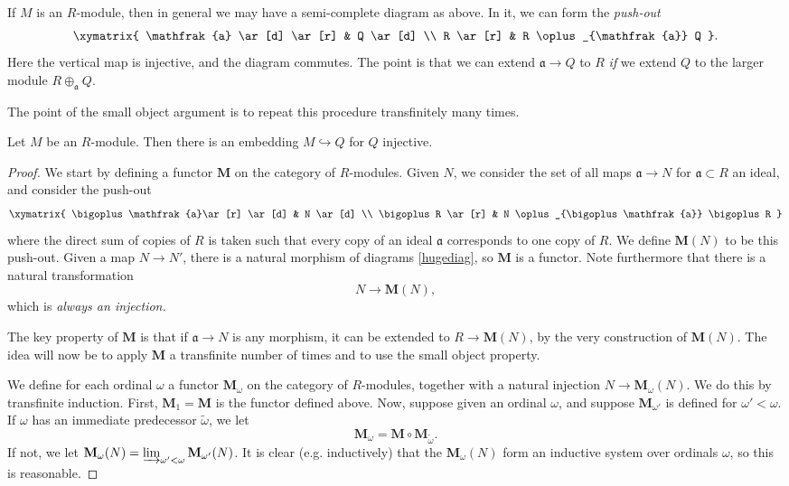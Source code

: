 If $M$ is an $R$-module, then in general we may have a semi-complete diagram as above. In
it, we can form the \emph{push-out}
\[ \xymatrix{
\mathfrak{a} \ar[d]  \ar[r] &  Q \ar[d] \\
R \ar[r] &  R \oplus_{\mathfrak{a}} Q 
}.\]
Here the vertical map is injective, and the diagram commutes.  The point is
that we can extend $\mathfrak{a} \to Q$ to $R$ \emph{if} we extend $Q$ to the
larger module $R \oplus_{\mathfrak{a}} Q$.


The point of the small object argument is to repeat this procedure
transfinitely many times.

\begin{theorem} 
Let $M$ be an $R$-module. Then there is an embedding $M \hookrightarrow Q$ for
$Q$ injective.
\end{theorem} 
\begin{proof} 
We start by defining a functor $\mathbf{M}$ on the category of $R$-modules.
Given $N$, we consider the set of all maps $\mathfrak{a} \to N$ for
$\mathfrak{a} \subset R$ an ideal, and consider the  push-out
\begin{equation} \label{hugediag}
\xymatrix{
\bigoplus \mathfrak{a}\ar[r] \ar[d]  & N \ar[d] \\
\bigoplus R \ar[r] &  N \oplus_{\bigoplus \mathfrak{a}} \bigoplus R
}
\end{equation}
where the direct sum of copies of $R$ is taken such that every copy of an
ideal $\mathfrak{a}$ corresponds to one copy of $R$.
We define $\mathbf{M}(N)$ to be this push-out. Given a map $N \to N'$, there
is a natural morphism of diagrams \cref{hugediag}, so $\mathbf{M}$ is a
functor.
Note furthermore that there is a natural transformation
\[ N \to \mathbf{M}(N),  \]
which is \emph{always an injection.}

The key property of $\mathbf{M}$ is that if $\mathfrak{a} \to N$ is any
morphism, it can be extended to $R \to \mathbf{M}(N)$, by the very
construction of $\mathbf{M}(N)$. The idea will now be to
apply $\mathbf{M}$ a transfinite number of times and to use the small object
property. 


We define for each ordinal $\omega$ a functor $\mathbf{M}_{\omega}$ on the
category of $R$-modules, together with a natural injection $N \to
\mathbf{M}_{\omega}(N)$. We do this by transfinite induction. 
First, $\mathbf{M}_1 = \mathbf{M}$ is the functor defined above.
Now, suppose given an ordinal $\omega$, and suppose $\mathbf{M}_{\omega'}$ is
defined for $\omega' < \omega$. If $\omega$ has an immediate predecessor
$\widetilde{\omega}$, we let
$$\mathbf{M}_{\omega} = \mathbf{M} \circ \mathbf{M}_{\widetilde{\omega}}.$$
If not, we let $\mathbf{M}_{\omega}(N) = \varinjlim_{\omega' < \omega}
\mathbf{M}_{\omega'}(N)$. 
It is clear (e.g. inductively) that the $\mathbf{M}_{\omega}(N)$ form an inductive system over
ordinals $\omega$, so this is reasonable. 


\end{proof}
